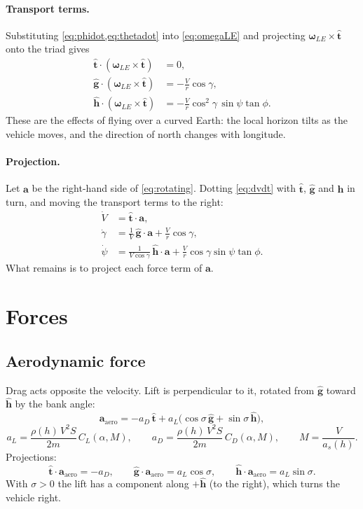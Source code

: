 \documentclass[11pt]{report}
\numberwithin{equation}{chapter}
\newcommand{\tth}{\hat{\mathbf t}}
\newcommand{\gh}{\hat{\mathbf g}}
\newcommand{\hh}{\hat{\mathbf h}}
\newcommand{\vb}[1]{\bm{#1}}
\newcommand{\aL}{a_L}
\newcommand{\aD}{a_D}
\begin{document}
\paragraph{Transport terms.} Substituting \cref{eq:phidot,eq:thetadot} into
\cref{eq:omegaLE} and projecting $\vb\omega_{LE}\times\tth$ onto the triad gives
\begin{align}
  \tth\cdot(\vb\omega_{LE}\times\tth) &= 0,\\
  \gh\cdot(\vb\omega_{LE}\times\tth) &= -\frac{V}{r}\cos\gamma,\\
  \hh\cdot(\vb\omega_{LE}\times\tth) &= -\frac{V}{r}\cos^2\!\gamma\,\sin\psi\tan\phi .
\end{align}
These are the effects of flying over a curved Earth: the local horizon tilts as the vehicle
moves, and the direction of north changes with longitude.

\paragraph{Projection.} Let $\vb a$ be the right-hand side of \cref{eq:rotating}. Dotting
\cref{eq:dvdt} with $\tth$, $\gh$ and $\hh$ in turn, and moving the transport terms to the
right:
\begin{align}
  \dot V &= \tth\cdot\vb a, \label{eq:Vdot_proj}\\
  \dot\gamma &= \frac{1}{V}\,\gh\cdot\vb a + \frac{V}{r}\cos\gamma, \label{eq:gdot_proj}\\
  \dot\psi &= \frac{1}{V\cos\gamma}\,\hh\cdot\vb a + \frac{V}{r}\cos\gamma\sin\psi\tan\phi .
  \label{eq:pdot_proj}
\end{align}
What remains is to project each force term of $\vb a$.

\section{Forces}

\subsection{Aerodynamic force}

Drag acts opposite the velocity. Lift is perpendicular to it, rotated from $\gh$ toward
$\hh$ by the bank angle:
\begin{equation}
  \vb a_{\text{aero}} = -\aD\,\tth + \aL\big(\cos\sigma\,\gh + \sin\sigma\,\hh\big),
\end{equation}
\begin{equation}
  \aL = \frac{\rho(h)\,V^2 S}{2m}\,C_L(\alpha, M),\qquad
  \aD = \frac{\rho(h)\,V^2 S}{2m}\,C_D(\alpha, M),\qquad
  M = \frac{V}{a_s(h)} .
  \label{eq:aero}
\end{equation}
Projections:
\[
  \tth\cdot\vb a_{\text{aero}} = -\aD,\qquad
  \gh\cdot\vb a_{\text{aero}} = \aL\cos\sigma,\qquad
  \hh\cdot\vb a_{\text{aero}} = \aL\sin\sigma .
\]
With $\sigma>0$ the lift has a component along $+\hh$ (to the right), which turns the
vehicle right.
\end{document}
